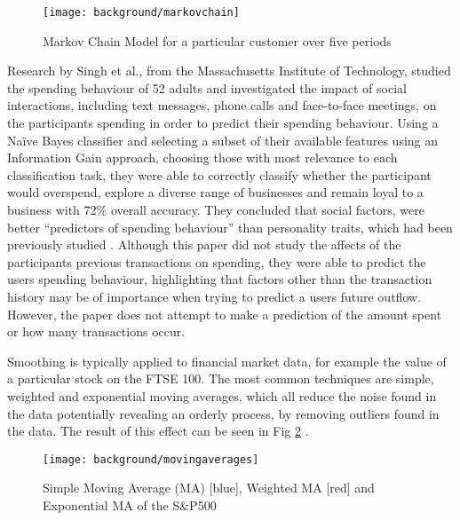 \begin{figure}[h]
    \centering
    \texttt{[image: background/markovchain]}
    \caption{Markov Chain Model for a particular customer over five periods \parencite[Fig. 1]{pfeifer2000modeling}}
    \label{fig:preifermarkovchain}
\end{figure}

Research by Singh et al., from the Massachusetts Institute of Technology, studied the spending behaviour of 52 adults and investigated the impact of social interactions, including text messages, phone calls and face-to-face meetings, on the participants spending in order to predict their spending behaviour. Using a Na\"{i}ve Bayes classifier and selecting a subset of their available features using an Information Gain approach, choosing those with most relevance to each classification task, they were able to correctly classify whether the participant would overspend, explore a diverse range of businesses and remain loyal to a business with 72\% overall accuracy. They concluded that social factors, were better ``predictors of spending behaviour'' than personality traits, which had been previously studied \parencite{singh2013spendingbehaviour}.
%
Although this paper did not study the affects of the participants previous transactions on spending, they were able to predict the users spending behaviour, highlighting that factors other than the transaction history may be of importance when trying to predict a users future outflow. However, the paper does not attempt to make a prediction of the amount spent or how many transactions occur.

Smoothing is typically applied to financial market data, for example the value of a particular stock on the FTSE 100. The most common techniques are simple, weighted and exponential moving averages, which all reduce the noise found in the data potentially revealing an orderly process, by removing outliers found in the data. The result of this effect can be seen in Fig \ref{fig:dashweightedaverages} \parencite{dash2012movingaverages}.

\begin{figure}[h]
    \centering
    \texttt{[image: background/movingaverages]}
    \caption{Simple Moving Average (MA) [blue], Weighted MA [red] and Exponential MA of the S\&P500 \protect\footnotemark \parencite[Fig. 5]{dash2012movingaverages}}
    \label{fig:dashweightedaverages}
\end{figure}

